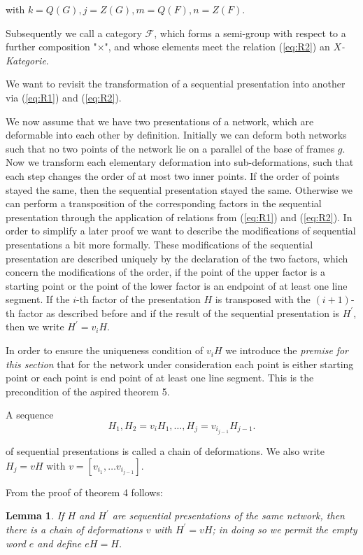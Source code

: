 \documentclass{article}
\newtheorem{lemma}{Lemma}
\begin{document}
with $k = Q(G), j = Z(G), m = Q(F), n = Z(F)$.

Subsequently we call a category $\mathcal{F}$, which forms a semi-group with respect to a further composition "$\times$", and whose elements meet the relation (\ref{eq:R2}) an \emph{$X$-Kategorie}. 

We want to revisit the transformation of a sequential presentation into another via (\ref{eq:R1}) and (\ref{eq:R2}).

We now assume that we have two presentations of a network, which are deformable into each other by definition. Initially we can deform both networks such that no two points of the network lie on a parallel of the base of frames $g$. 
Now we transform each elementary deformation into sub-deformations, such that each step changes the order of at most two inner points. 
If the order of points stayed the same, then the sequential presentation stayed the same. 
Otherwise we can perform a transposition of the corresponding factors in the sequential presentation through the application of relations from (\ref{eq:R1}) and (\ref{eq:R2}). 
In order to simplify a later proof we want to describe the modifications of sequential presentations a bit more formally. 
These modifications of the sequential presentation are described uniquely by the declaration of the two factors, which concern the modifications of the order, if the point of the upper factor is a starting point or the point of the lower factor is an endpoint of at least one line segment. 
If the $i$-th factor of the presentation $H$ is transposed with the $(i + 1)$-th factor as described before and if the result of the sequential presentation is $H^{\prime}$, then we write $H^{\prime} = v_{i} H$.

In order to ensure the uniqueness condition of $v_i H$ we introduce the \emph{premise} \emph{for this section} that for the network under consideration each point is either starting point or each point is end point of at least one line segment. 
This is the precondition of the aspired theorem 5.

A sequence 
\[
  H_1, H_2 = v_i H_1, \ldots , H_j = v_{i_{j-1}} H_{j-1}.
\]

of sequential presentations is called a chain of deformations. We also write $H_j = v H$ with $v = [v_{i_1}, \ldots v_{i_{j-1}}]$. 

From the proof of theorem 4 follows:

\begin{lemma}
\label{eq:l1}
If $H$ and $H^{\prime}$ are sequential presentations of the same network, then there is a chain of deformations $v$ with $H^{\prime} = v H$; in doing so we permit the empty word $e$ and define $eH = H$.
\end{lemma}
\end{document}
